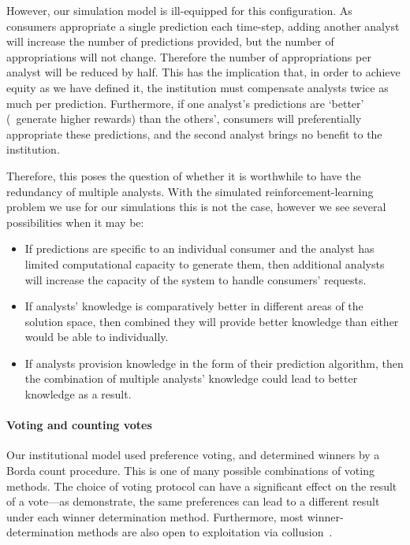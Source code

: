 However, our simulation model is ill-equipped for this configuration. As
consumers appropriate a single prediction each time-step, adding another
analyst will increase the number of predictions provided, but the number 
of appropriations will not change. Therefore the number of appropriations 
per analyst will be reduced by half. This has
the implication that, in order to achieve equity as we have defined it, the
institution must compensate analysts twice as much per prediction.
Furthermore, if one analyst's predictions are `better' (\ie\ generate higher rewards) than the others', consumers will preferentially appropriate these
predictions, and the second analyst brings no benefit to the institution.

Therefore, this poses the question of whether it is worthwhile to have the
redundancy of multiple analysts. With the simulated reinforcement-learning
problem we use for our simulations this is not the case, however we see several possibilities when
it may be:

\begin{itemize}
\item If predictions are specific to an individual consumer and the analyst has limited computational capacity to generate them, then additional analysts will increase the capacity of the system to handle consumers' requests.
\item If analysts' knowledge is comparatively better in different areas of the solution space, then combined they will provide better knowledge than either would be able to individually.
\item If analysts provision knowledge in the form of their prediction algorithm, then the combination of multiple analysts' knowledge could lead to better knowledge as a result. 
\end{itemize}

\paragraph{Voting and counting votes} Our institutional model used preference
voting, and determined winners by a Borda count procedure. This is one of many
possible combinations of voting methods. The choice of voting protocol can have
a significant effect on the result of a vote---as \citet{Pitt2011b}
demonstrate, the same preferences can lead to a different result under each
winner determination method. Furthermore, most winner-determination methods
are also open to exploitation via collusion~\citep{Conitzer2007}.

